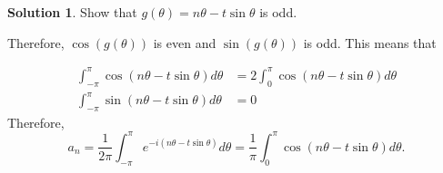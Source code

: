 \documentclass[12pt]{article}
\theoremstyle{definition}
\newtheorem{sol}{Solution}
\theoremstyle{remark}
\begin{document}
\begin{sol}
Show that $g(\theta) = n\theta - t\sin\theta$ is odd. 

Therefore, $\cos(g(\theta))$ is even and $\sin(g(\theta))$ is odd. This means that

\begin{align}
    \int_{-\pi}^\pi \cos ( n\theta - t\sin\theta )d\theta &= 2 \int_{0}^\pi \cos ( n\theta - t\sin\theta )d\theta \\
    \int_{-\pi}^{\pi} \sin( n\theta - t\sin\theta ) d\theta &= 0
\end{align}
Therefore,
\begin{equation}
    a_n = \frac{1}{2\pi} \int_{-\pi}^\pi e^{-i(n\theta - t\sin\theta)}d\theta = \frac{1}{\pi} \int_{0}^\pi \cos ( n\theta - t\sin\theta )d\theta.
\end{equation}
\end{sol}
\end{document}
